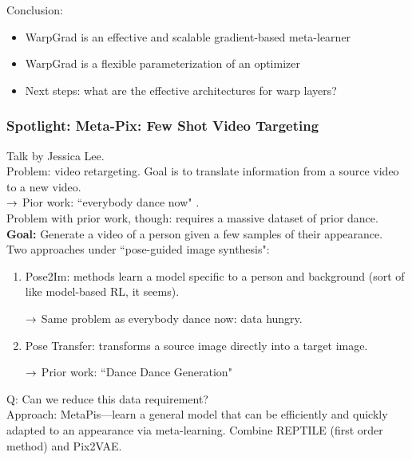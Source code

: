 Conclusion:
\begin{itemize}
    \item WarpGrad is an effective and scalable gradient-based meta-learner
    \item WarpGrad is a flexible parameterization of an optimizer
    \item Next steps: what are the effective architectures for warp layers?
\end{itemize}

\subsubsection{Spotlight: Meta-Pix: Few Shot Video Targeting}

Talk by Jessica Lee. \\

Problem: video retargeting. Goal is to translate information from a source video to a new video. \\

$\rightarrow$ Pior work: ``everybody dance now" . \\

Problem with prior work, though: requires a massive dataset of prior dance. \\

{\bf Goal:} Generate a video of a person given a few samples of their appearance. \\

Two approaches under ``pose-guided image synthesis":
\begin{enumerate}
    \item Pose2Im: methods learn a model specific to a person and background (sort of like model-based RL, it seems).
    
    $\rightarrow$ Same problem as everybody dance now: data hungry.
    
    \item Pose Transfer: transforms a source image directly into a target image.
    
    $\rightarrow$ Prior work: ``Dance Dance Generation"
\end{enumerate}

Q: Can we reduce this data requirement? \\

Approach: MetaPis---learn a general model that can be efficiently and quickly adapted to an appearance via meta-learning. Combine REPTILE (first order method) and Pix2VAE. \\

